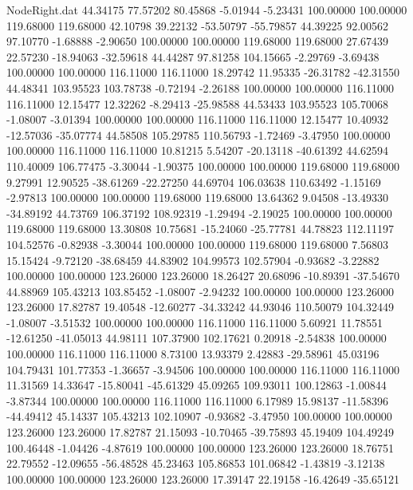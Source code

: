 \begin{filecontents}{NodeRight.dat}
  44.34175   77.57202   80.45868    -5.01944   -5.23431  100.00000  100.00000  119.68000  119.68000   42.10798   39.22132  -53.50797  -55.79857
  44.39225   92.00562   97.10770    -1.68888   -2.90650  100.00000  100.00000  119.68000  119.68000   27.67439   22.57230  -18.94063  -32.59618
  44.44287   97.81258  104.15665    -2.29769   -3.69438  100.00000  100.00000  116.11000  116.11000   18.29742   11.95335  -26.31782  -42.31550
  44.48341  103.95523  103.78738    -0.72194   -2.26188  100.00000  100.00000  116.11000  116.11000   12.15477   12.32262   -8.29413  -25.98588
  44.53433  103.95523  105.70068    -1.08007   -3.01394  100.00000  100.00000  116.11000  116.11000   12.15477   10.40932  -12.57036  -35.07774
  44.58508  105.29785  110.56793    -1.72469   -3.47950  100.00000  100.00000  116.11000  116.11000   10.81215    5.54207  -20.13118  -40.61392
  44.62594  110.40009  106.77475    -3.30044   -1.90375  100.00000  100.00000  119.68000  119.68000    9.27991   12.90525  -38.61269  -22.27250
  44.69704  106.03638  110.63492    -1.15169   -2.97813  100.00000  100.00000  119.68000  119.68000   13.64362    9.04508  -13.49330  -34.89192
  44.73769  106.37192  108.92319    -1.29494   -2.19025  100.00000  100.00000  119.68000  119.68000   13.30808   10.75681  -15.24060  -25.77781
  44.78823  112.11197  104.52576    -0.82938   -3.30044  100.00000  100.00000  119.68000  119.68000    7.56803   15.15424   -9.72120  -38.68459
  44.83902  104.99573  102.57904    -0.93682   -3.22882  100.00000  100.00000  123.26000  123.26000   18.26427   20.68096  -10.89391  -37.54670
  44.88969  105.43213  103.85452    -1.08007   -2.94232  100.00000  100.00000  123.26000  123.26000   17.82787   19.40548  -12.60277  -34.33242
  44.93046  110.50079  104.32449    -1.08007   -3.51532  100.00000  100.00000  116.11000  116.11000    5.60921   11.78551  -12.61250  -41.05013
  44.98111  107.37900  102.17621     0.20918   -2.54838  100.00000  100.00000  116.11000  116.11000    8.73100   13.93379    2.42883  -29.58961
  45.03196  104.79431  101.77353    -1.36657   -3.94506  100.00000  100.00000  116.11000  116.11000   11.31569   14.33647  -15.80041  -45.61329
  45.09265  109.93011  100.12863    -1.00844   -3.87344  100.00000  100.00000  116.11000  116.11000    6.17989   15.98137  -11.58396  -44.49412
  45.14337  105.43213  102.10907    -0.93682   -3.47950  100.00000  100.00000  123.26000  123.26000   17.82787   21.15093  -10.70465  -39.75893
  45.19409  104.49249  100.46448    -1.04426   -4.87619  100.00000  100.00000  123.26000  123.26000   18.76751   22.79552  -12.09655  -56.48528
  45.23463  105.86853  101.06842    -1.43819   -3.12138  100.00000  100.00000  123.26000  123.26000   17.39147   22.19158  -16.42649  -35.65121

\end{filecontents}
